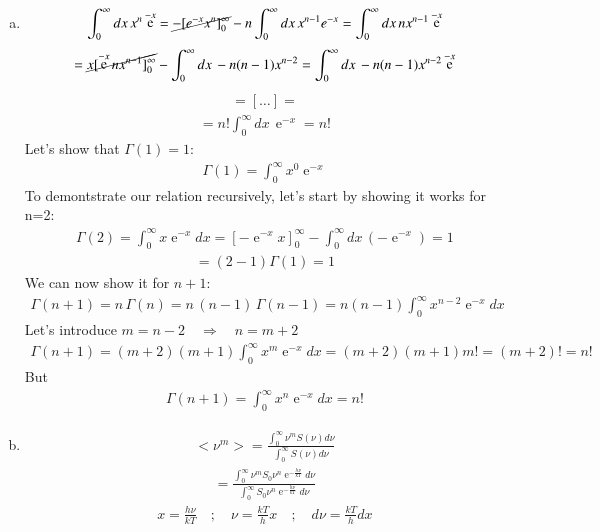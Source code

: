 \documentclass[a4paper,12pt]{article}
\DeclareMathOperator{\e}{e}
\newcommand{\enkt}{\e^{-\frac{h\nu}{kT}}}
\newcommand{\intzinf}{\int_0^\infty}
\newcommand{\emx}{\ensuremath{\e^{-x}}}
\begin{document}
\begin{enumerate}
\begin{align}
		\end{align}
		\begin{enumerate}[(a)]
		\item 
			\begin{align}
			\intzinf dx\,x^n \e^{-x} = \cancel{-[e^{-x}x^n]^\infty_0} -n\intzinf dx\,x^{n-1}e^{-x}=\intzinf dx\,nx^{n-1}\emx
			\end{align}
			\begin{align}
			=\cancel{x[\emx nx^{n-1}]_0^\infty}-\intzinf dx\,-n(n-1)x^{n-2}=\intzinf dx\, -n(n-1)x^{n-2}\emx
			\end{align}
			\begin{align}
			=[\dots]=
			\end{align}
			\begin{align}
			=n!\intzinf dx\,\emx=n!
			\end{align}
		Let's show that $\Gamma(1)=1$:
			\begin{align}
			\Gamma (1) =\intzinf x^0\emx
			\end{align}
		To demontstrate our relation recursively, let's start by showing it works for n=2:
		\begin{align}
		\Gamma(2) =\intzinf x\emx dx = [-\emx x]_0^\infty - \intzinf dx\, (-\emx) = 1
		\end{align}
		\begin{align}
		=(2-1)\Gamma(1)=1
		\end{align}
		We can now show it for $n+1$:
		\begin{align}
		\Gamma(n+1)=n\,\Gamma(n) = n\,(n-1)\,\Gamma(n-1)=n(n-1)\intzinf x^{n-2}\emx dx
		\end{align}
		Let's introduce $m=n-2\quad \Rightarrow \quad n=m+2$
		\begin{align}
		\Gamma(n+1)=(m+2)(m+1)\intzinf x^m\emx dx = (m+2)(m+1)m! = (m+2)! = n!
		\end{align}
		But
		\begin{align}
			\Gamma(n+1)=\intzinf x^n \emx dx = n!
		\end{align}
	\item
		\begin{align}
		< \nu^m>=\frac{\intzinf \nu^mS(\nu)d\nu}{\intzinf S(\nu)d\nu}
		\end{align}
		\begin{align}
		=\frac{\intzinf\nu^mS_0\nu^n \enkt d\nu}{\intzinf S_0 \nu^n\enkt d\nu}
		\end{align}
		\begin{align}
		x=\frac{h\nu}{kT}\quad;\quad \nu=\frac{kT}{h}x\quad ;\quad d\nu=\frac{kT}{h}dx

\end{align}
\end{enumerate}
\end{enumerate}
\end{document}
